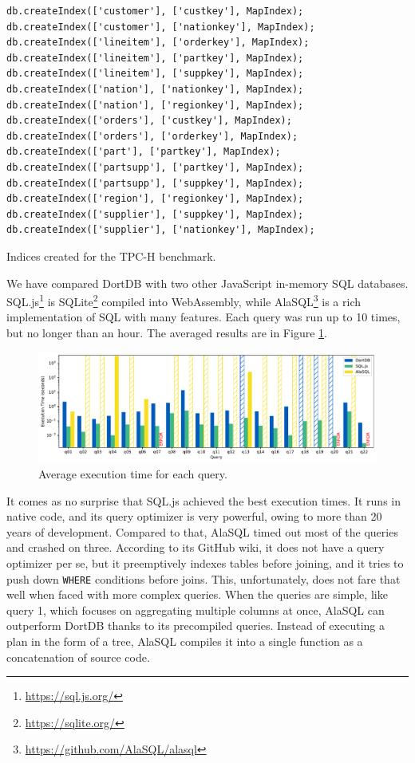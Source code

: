 
\begin{listing}[!ht]
\begin{verbatim}
db.createIndex(['customer'], ['custkey'], MapIndex);
db.createIndex(['customer'], ['nationkey'], MapIndex);
db.createIndex(['lineitem'], ['orderkey'], MapIndex);
db.createIndex(['lineitem'], ['partkey'], MapIndex);
db.createIndex(['lineitem'], ['suppkey'], MapIndex);
db.createIndex(['nation'], ['nationkey'], MapIndex);
db.createIndex(['nation'], ['regionkey'], MapIndex);
db.createIndex(['orders'], ['custkey'], MapIndex);
db.createIndex(['orders'], ['orderkey'], MapIndex);
db.createIndex(['part'], ['partkey'], MapIndex);
db.createIndex(['partsupp'], ['partkey'], MapIndex);
db.createIndex(['partsupp'], ['suppkey'], MapIndex);
db.createIndex(['region'], ['regionkey'], MapIndex);
db.createIndex(['supplier'], ['suppkey'], MapIndex);
db.createIndex(['supplier'], ['nationkey'], MapIndex);
\end{verbatim}
\caption{Indices created for the TPC-H benchmark.}
\end{listing}

We have compared DortDB with two other JavaScript in-memory SQL data\-bases. SQL.js\footnote{\url{https://sql.js.org/}} is SQLite\footnote{\url{https://sqlite.org/}} compiled into WebAssembly, while AlaSQL\footnote{\url{https://github.com/AlaSQL/alasql}} is a rich implementation of SQL with many features. Each query was run up to 10 times, but no longer than an hour. The averaged results are in Figure \ref{fig:tpch-execution}.

\begin{figure}[!ht]
    \centering
    \includegraphics[width=\linewidth]{img/tpch-execution.pdf}
    \caption{Average execution time for each query.}
    \label{fig:tpch-execution}
\end{figure}

It comes as no surprise that SQL.js achieved the best execution times. It runs in native code, and its query optimizer is very powerful, owing to more than 20 years of development. Compared to that, AlaSQL timed out most of the queries and crashed on three. According to its GitHub wiki, it does not have a query optimizer per se, but it preemptively indexes tables before joining, and it tries to push down \texttt{WHERE} conditions before joins. This, unfortunately, does not fare that well when faced with more complex queries. When the queries are simple, like query 1, which focuses on aggregating multiple columns at once, AlaSQL can outperform DortDB thanks to its precompiled queries. Instead of executing a plan in the form of a tree, AlaSQL compiles it into a single function as a concatenation of source code.

